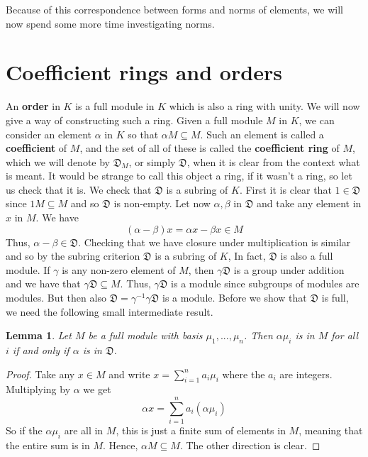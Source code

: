\documentclass{article}
\newtheorem{lemma}{Lemma}[section]
\newcommand{\mfrak}[1]{\mathfrak{#1}}
\begin{document}
Because of this correspondence between forms and norms of elements, we will now spend some more time investigating norms. 

\section*{Coefficient rings and orders}
An \textbf{order} in $K$ is a full module in $K$ which is also a ring with unity. We will now give a way of constructing such a ring. Given a full module $M$ in $K$, we can consider an element $\alpha$ in $K$ so that $\alpha M \subseteq M$. Such an element is called a \textbf{coefficient} of $M$, and the set of all of these is called the \textbf{coefficient ring} of $M$, which we will denote by $\mfrak D_M$, or simply $\mfrak D$, when it is clear from the context what is meant. It would be strange to call this object a ring, if it wasn't a ring, so let us check that it is. We check that $\mfrak D$ is a subring of $K$. First it is clear that $1 \in \mfrak{D}$ since $1 M \subseteq M$ and so $\mfrak{D}$ is non-empty. Let now $\alpha, \beta$ in $\mfrak D$ and take any element in $x$ in $M$. We have $$(\alpha - \beta)x = \alpha x - \beta x \in M$$
Thus, $\alpha - \beta \in \mfrak{D}$. Checking that we have closure under multiplication is similar and so by the subring criterion $\mfrak{D}$ is a subring of $K$, In fact, $\mfrak{D}$ is also a full module. If $\gamma$ is any non-zero element of $M$, then $\gamma \mfrak{D}$ is a group under addition and we have that $\gamma \mfrak{D} \subseteq M$. Thus, $\gamma \mfrak D$ is a module since subgroups of modules are modules. But then also $\mfrak{D} = \gamma^{-1} \gamma \mfrak{D}$ is a module. Before we show that $\mfrak D$ is full, we need the following small intermediate result.

\begin{lemma}\label{lem:SufficientConditionForCoefficient}
    Let $M$ be a full module with basis $\mu_1, ..., \mu_n$. Then $\alpha \mu_i$ is in $M$ for all $i$ if and only if $\alpha$ is in $\mfrak D$.
\end{lemma}
\begin{proof}
    Take any $x \in M$ and write $x = \sum_{i=1}^n a_i \mu_i$ where the $a_i$ are integers. Multiplying by $\alpha$ we get
    $$\alpha x = \sum_{i=1}^n a_i (\alpha \mu_i)$$
    So if the $\alpha \mu_i$ are all in $M$, this is just a finite sum of elements in $M$, meaning that the entire sum is in $M$. Hence, $\alpha M \subseteq M$. The other direction is clear. 
\end{proof}
\end{document}
